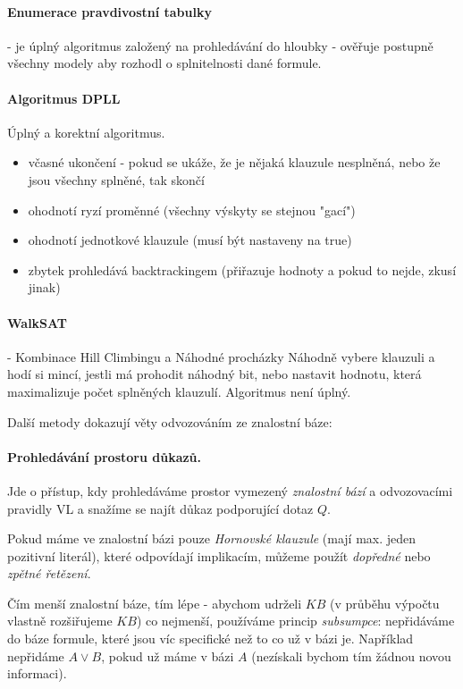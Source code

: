 \documentclass[a4paper]{article}      %
\begin{document}
\paragraph{Enumerace pravdivostní tabulky} - je úplný algoritmus založený na prohledávání do hloubky - ověřuje postupně všechny modely aby rozhodl o splnitelnosti dané formule.

\paragraph{Algoritmus DPLL}
Úplný a korektní algoritmus.
\begin{itemize}
\item včasné ukončení - pokud se ukáže, že je nějaká klauzule nesplněná, nebo že jsou všechny splněné, tak skončí
\item ohodnotí ryzí proměnné (všechny výskyty se stejnou "gací")
\item ohodnotí jednotkové klauzule (musí být nastaveny na true)
\item zbytek prohledává backtrackingem (přiřazuje hodnoty a pokud to nejde, zkusí jinak)
\end{itemize} 

\paragraph{WalkSAT} - Kombinace Hill Climbingu a Náhodné procházky
Náhodně vybere klauzuli a hodí si mincí, jestli má prohodit náhodný bit, nebo nastavit hodnotu, která maximalizuje počet splněných klauzulí.
Algoritmus není úplný.

Další metody dokazují věty odvozováním ze znalostní báze:

\paragraph{Prohledávání prostoru důkazů.} Jde o přístup, kdy prohledáváme prostor vymezený \emph{znalostní bází} a odvozovacími pravidly VL
a snažíme se najít důkaz podporující dotaz $Q$.

Pokud máme ve znalostní bázi pouze \emph{Hornovské klauzule} (mají max. jeden pozitivní literál), které odpovídají implikacím,
můžeme použít \emph{dopředné} nebo \emph{zpětné řetězení}. 

Čím menší znalostní báze, tím lépe - abychom udrželi $KB$ (v průběhu výpočtu vlastně rozšiřujeme $KB$) co nejmenší, používáme princip
\emph{subsumpce}: nepřidáváme do báze formule, které jsou víc specifické než to co už v bázi je.
Například nepřidáme $A \vee B$, pokud už máme v bázi $A$ (nezískali bychom tím žádnou novou informaci).
\end{document}
